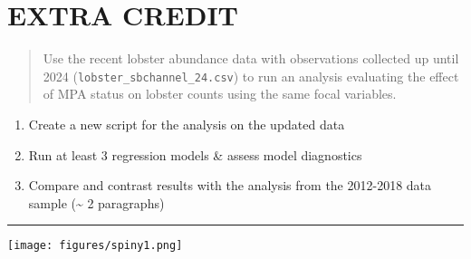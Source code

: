 \documentclass[
]{article}
\providecommand{\tightlist}{%
  \setlength{\itemsep}{0pt}\setlength{\parskip}{0pt}}
\begin{document}
\section{EXTRA CREDIT}\label{extra-credit}

\begin{quote}
Use the recent lobster abundance data with observations collected up
until 2024 (\texttt{lobster\_sbchannel\_24.csv}) to run an analysis
evaluating the effect of MPA status on lobster counts using the same
focal variables.
\end{quote}

\begin{enumerate}
\def\labelenumi{\alph{enumi}.}
\tightlist
\item
  Create a new script for the analysis on the updated data
\item
  Run at least 3 regression models \& assess model diagnostics
\item
  Compare and contrast results with the analysis from the 2012-2018 data
  sample (\textasciitilde{} 2 paragraphs)
\end{enumerate}

\begin{center}\rule{0.5\linewidth}{0.5pt}\end{center}

\texttt{[image: figures/spiny1.png]}
\end{document}
